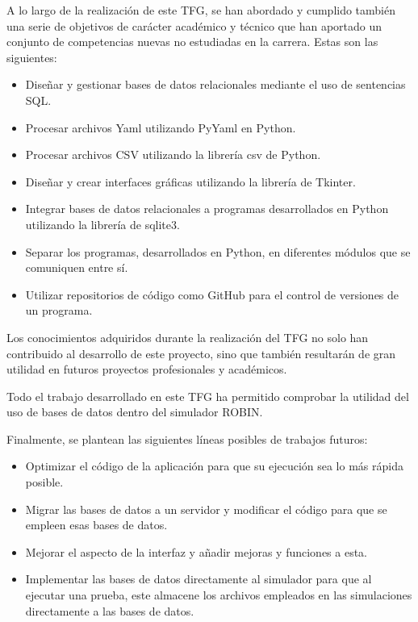 A lo largo de la realización de este \acrshort{TFG}, se han abordado y cumplido también una serie de objetivos de carácter académico y técnico que han aportado un conjunto de competencias nuevas no estudiadas en la carrera. Estas son las siguientes:
\begin{itemize}
    \item Diseñar y gestionar bases de datos relacionales mediante el uso de sentencias \acrshort{SQL}.

    \item Procesar archivos \acrshort{Yaml} utilizando PyYaml en Python.

    \item Procesar archivos \acrshort{CSV} utilizando la librería csv de Python.
    
    \item Diseñar y crear interfaces gráficas utilizando la librería de Tkinter.
    
    \item Integrar bases de datos relacionales a programas desarrollados en Python utilizando la librería de sqlite3.

    \item Separar los programas, desarrollados en Python, en diferentes módulos que se comuniquen entre sí.

    \item Utilizar repositorios de código como GitHub para el control de versiones de un programa.
\end{itemize}

Los conocimientos adquiridos durante la realización del \acrshort{TFG} no solo han contribuido al desarrollo de este proyecto, sino que también resultarán de gran utilidad en futuros proyectos profesionales y académicos.

Todo el trabajo desarrollado en este \acrshort{TFG} ha permitido comprobar la utilidad del uso de bases de datos dentro del simulador \acrshort{ROBIN}.

Finalmente, se plantean las siguientes líneas posibles de trabajos futuros:

\begin{itemize}
    \item Optimizar el código de la aplicación para que su ejecución sea lo más rápida posible.
    
    \item Migrar las bases de datos a un servidor y modificar el código para que se empleen esas bases de datos.

    \item Mejorar el aspecto de la interfaz y añadir mejoras y funciones a esta.

    \item Implementar las bases de datos directamente al simulador para que al ejecutar una prueba, este almacene los archivos empleados en las simulaciones directamente a las bases de datos.
\end{itemize}
